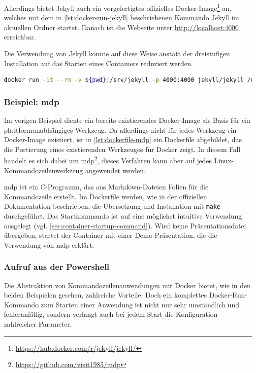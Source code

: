 Allerdings bietet Jekyll auch ein vorgefertigtes offizielles Docker-Image\footnote{\url{https://hub.docker.com/r/jekyll/jekyll/}} an, welches mit dem in \cref{lst:docker-run-jekyll} beschriebenen Kommando Jekyll im aktuellen Ordner startet.
Danach ist die Webseite unter \url{http://localhost:4000} erreichbar.

Die Verwendung von Jekyll konnte auf diese Weise anstatt der dreistufigen Installation auf das Starten eines Containers reduziert werden.

\begin{lstlisting}[caption=Docker-Kommando zum Starten von Jekyll, language=bash, label=lst:docker-run-jekyll]
docker run -it --rm -v ${pwd}:/srv/jekyll -p 4000:4000 jekyll/jekyll /usr/local/bin/jekyll serve
\end{lstlisting}

\subsubsection{Beispiel: mdp}
Im vorigen Beispiel diente ein bereits existierendes Docker-Image als Basis für ein plattformunabhängiges Werkzeug.
Da allerdings nicht für jedes Werkzeug ein Docker-Image existiert, ist in \cref{lst:dockerfile-mdp} ein Dockerfile abgebildet, das die Portierung eines existierenden Werkzeuges für Docker zeigt.
In diesem Fall handelt es sich dabei um mdp\footnote{\url{https://github.com/visit1985/mdp}}, dieses Verfahren kann aber auf jedes Linux-Kommandozeilenwerkzeug angewendet werden.

mdp ist ein C-Programm, das aus Markdown-Dateien Folien für die Kommandozeile erstellt.
Im Dockerfile werden, wie in der offiziellen Dokumentation beschrieben, die Übersetzung und Installation mit \texttt{make} durchgeführt.
Das Startkommando ist auf eine möglichst intuitive Verwendung ausgelegt (vgl. \cref{sec:container-startup-command}).
Wird keine Präsentationsdatei übergeben, startet der Container mit einer Demo-Präsentation, die die Verwendung von mdp erklärt.



\subsubsection{Aufruf aus der Powershell}
Die Abstraktion von Kommandozeilenanwendungen mit Docker bietet, wie in den beiden Beispielen gesehen, zahlreiche Vorteile.
Doch ein komplettes Docker-Run-Kommando zum Starten einer Anwendung ist nicht nur sehr umständlich und fehleranfällig, sondern verlangt auch bei jedem Start die Konfiguration zahlreicher Parameter.

